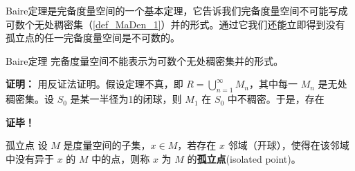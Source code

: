
Baire定理是完备度量空间的一个基本定理，它告诉我们完备度量空间不可能写成可数个无处稠密集（\autoref{def_MaDen_1}）并的形式。通过它我们还能立即得到没有孤立点的任一完备度量空间是不可数的。

\begin{theorem}{Baire定理}
完备度量空间不能表示为可数个无处稠密集并的形式。
\end{theorem}
\textbf{证明：}
用反证法证明。假设定理不真，即 $R=\bigcup_{n=1}^\infty M_n$，其中每一 $M_n$ 是无处稠密集。设 $S_0$ 是某一半径为1的闭球，则 $M_1$ 在 $S_0$ 中不稠密。于是，存在

\textbf{证毕！}


\begin{definition}{孤立点}
设 $M$ 是度量空间的子集，$x\in M$，若存在 $x$ 邻域（开球），使得在该邻域中没有异于 $x$ 的 $M$ 中的点，则称 $x$ 为 $M$ 的\textbf{孤立点}(isolated point)。

\end{definition}





